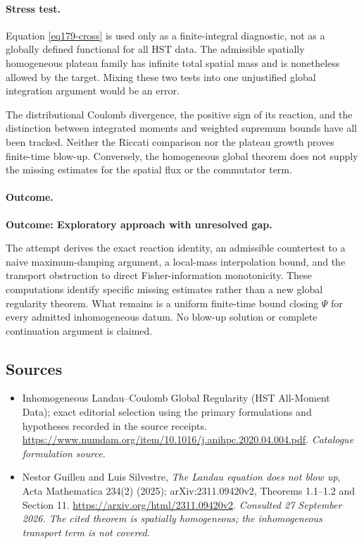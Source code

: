 \documentclass[11pt,a4paper]{article}
\numberwithin{equation}{section}
\begin{document}
\paragraph{Stress test.}
Equation \eqref{eq179-cross} is used only as a finite-integral diagnostic,
not as a globally defined functional for all HST data. The admissible
spatially homogeneous plateau family has infinite total spatial mass and
is nonetheless allowed by the target. Mixing these two tests into one
unjustified global integration argument would be an error.

The distributional Coulomb divergence, the positive sign of its reaction,
and the distinction between integrated moments and weighted supremum
bounds have all been tracked. Neither the Riccati comparison nor the
plateau growth proves finite-time blow-up. Conversely, the homogeneous
global theorem does not supply the missing estimates for the spatial flux
or the commutator term.

\paragraph{Outcome.}
\textbf{Outcome: Exploratory approach with unresolved gap.}

The attempt derives the exact reaction identity, an admissible countertest
to a naive maximum-damping argument, a local-mass interpolation bound, and
the transport obstruction to direct Fisher-information monotonicity.
These computations identify specific missing estimates rather than a new
global regularity theorem. What remains is a uniform finite-time bound
closing $\Psi$ for every admitted inhomogeneous datum. No blow-up solution
or complete continuation argument is claimed.
\subsection{Sources}
\begin{itemize}\raggedright
\item[\textnormal{[S1]}]\hypertarget{source:30006773:1}{} Inhomogeneous Landau–Coulomb Global Regularity (HST All-Moment Data); exact editorial selection using the primary formulations and hypotheses recorded in the source receipts.
\url{https://www.numdam.org/item/10.1016/j.anihpc.2020.04.004.pdf}.
{\small\textit{Catalogue formulation source.}}
\item[\textnormal{[E1]}]\hypertarget{extra:30006773:1}{} Nestor Guillen and
Luis Silvestre, \emph{The Landau equation does not blow up},
Acta Mathematica 234(2) (2025); arXiv:2311.09420v2,
Theorems 1.1--1.2 and Section 11.
\url{https://arxiv.org/html/2311.09420v2}.
{\small\textit{Consulted 27 September 2026. The cited theorem is
spatially homogeneous; the inhomogeneous transport term is not covered.}}
\end{itemize}
\end{document}
